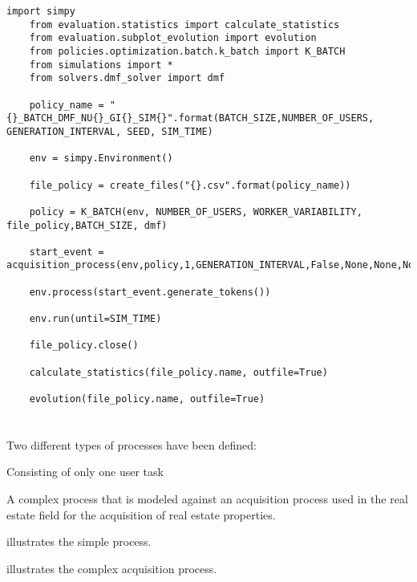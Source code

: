 \begin{lstlisting}[caption=Example of the structure of a simulation script. Here for the K-Batch policy using the \gls{dmf} formulation,label=lst:simulation_script,style=CustomPython]
	import simpy
	from evaluation.statistics import calculate_statistics
	from evaluation.subplot_evolution import evolution
	from policies.optimization.batch.k_batch import K_BATCH
	from simulations import *
	from solvers.dmf_solver import dmf

	policy_name = "{}_BATCH_DMF_NU{}_GI{}_SIM{}".format(BATCH_SIZE,NUMBER_OF_USERS, GENERATION_INTERVAL, SEED, SIM_TIME)

	env = simpy.Environment()

	file_policy = create_files("{}.csv".format(policy_name))

	policy = K_BATCH(env, NUMBER_OF_USERS, WORKER_VARIABILITY, file_policy,BATCH_SIZE, dmf)

	start_event = acquisition_process(env,policy,1,GENERATION_INTERVAL,False,None,None,None)

	env.process(start_event.generate_tokens())

	env.run(until=SIM_TIME)

	file_policy.close()

	calculate_statistics(file_policy.name, outfile=True)

	evolution(file_policy.name, outfile=True)
\end{lstlisting}

\section{}

Two different types of processes have been defined:
\begin{enumerate*}
	\item Consisting of only one user task
	\item A complex process that is modeled against an acquisition process used in the real estate field for the acquisition of real estate properties.
\end{enumerate*}

 illustrates the simple process.


 illustrates the complex acquisition process.

